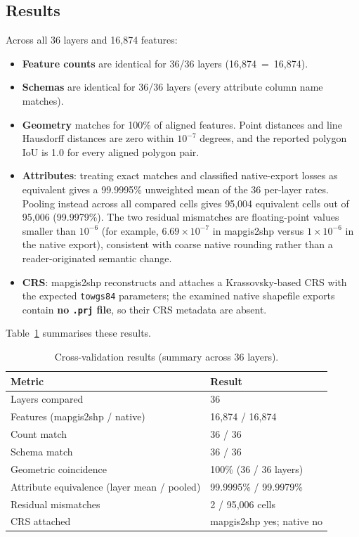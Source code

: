 \documentclass[11pt,a4paper]{article}
\begin{document}
\subsection{Results}
Across all 36 layers and 16{,}874 features:
\begin{itemize}
  \item \textbf{Feature counts} are identical for 36/36 layers (16{,}874~=~16{,}874).
  \item \textbf{Schemas} are identical for 36/36 layers (every attribute column name matches).
  \item \textbf{Geometry} matches for 100\% of aligned features. Point distances and line Hausdorff distances are zero within $10^{-7}$ degrees, and the reported polygon IoU is 1.0 for every aligned polygon pair.
  \item \textbf{Attributes}: treating exact matches and classified native-export losses as equivalent gives a 99.9995\% unweighted mean of the 36 per-layer rates. Pooling instead across all compared cells gives 95{,}004 equivalent cells out of 95{,}006 (99.9979\%). The two residual mismatches are floating-point values smaller than $10^{-6}$ (for example, $6.69\times10^{-7}$ in mapgis2shp versus $1\times10^{-6}$ in the native export), consistent with coarse native rounding rather than a reader-originated semantic change.
  \item \textbf{CRS}: mapgis2shp reconstructs and attaches a Krassovsky-based CRS with the expected \texttt{towgs84} parameters; the examined native shapefile exports contain \textbf{no \texttt{.prj} file}, so their CRS metadata are absent.
\end{itemize}

Table~\ref{tab:results} summarises these results.

\begin{table}[h]
\centering
\caption{Cross-validation results (summary across 36 layers).}
\label{tab:results}
\begin{tabular}{ll}
\toprule
Metric & Result \\
\midrule
Layers compared & 36 \\
Features (mapgis2shp / native) & 16{,}874 / 16{,}874 \\
Count match & 36 / 36 \\
Schema match & 36 / 36 \\
Geometric coincidence & 100\% (36 / 36 layers) \\
Attribute equivalence (layer mean / pooled) & 99.9995\% / 99.9979\% \\
Residual mismatches & 2 / 95{,}006 cells \\
CRS attached & mapgis2shp yes; native no \\
\bottomrule
\end{tabular}
\end{table}
\end{document}
